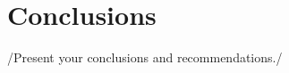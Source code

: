 \newpage
\section{Conclusions}
\label{S6}
/{Present your conclusions and recommendations.}/\cite{sharpe}\cite{gnuplot}